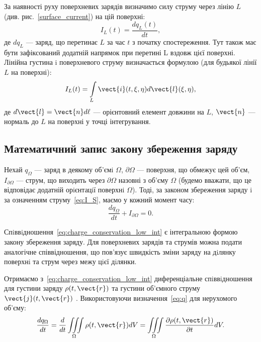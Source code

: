 \begin{itemize}
	      За наявності руху поверхневих зарядів визначимо силу струму через лінію
	      $L$ (див. рис.~\ref{surface_current}) на цій поверхні:
	      \begin{equation}
		      I_L(t) = \frac{dq_L(t)}{dt},
	      \end{equation}
	      де $dq_L$ --- заряд, що перетинає $L$ за час $ t$ з початку спостереження. Тут також
	      має бути зафіксований додатній напрямок при перетині L вздовж цієї поверхні.
	      Лінійна густина i поверхневого струму визначається формулою (для будьякої лінії $L$ на поверхні):
	      \begin{equation}
		      I_L(t) = \int\limits_L \vect{i}(t, \xi, \eta) d\vect{l}(\xi, \eta),
	      \end{equation}
	      де $d\vect{l} = \vect{n} d \ell$ --- орієнтовний елемент довжини на $L$, $\vect{n}$ --- нормаль до $L$ на поверхні у
	      точці інтегрування.

\end{itemize}

\subsection*{Математичний запис закону збереження заряду}


Нехай $q_{\Omega}$ --- заряд в деякому об'ємi $\Omega$, $\partial\Omega$ --- поверхня, що обмежує цей
об'єм, $I_{\partial\Omega}$ --- струм, що виходить через $\partial\Omega$ назовні з об'єму $\Omega$ (будемо вважати,
що це відповідає додатній орiєнтацiї поверхнi $\Omega$). Тоді, за законом збереження заряду i за означенням струму~\eqref{eq:I_S}, маємо у кожний момент
часу:
\begin{equation}\label{eq:charge_conservation_low_int}
	\frac{dq_{\Omega}}{dt} + I_{\partial\Omega}   = 0.
\end{equation}

Спiввiдношення~\eqref{eq:charge_conservation_low_int} є інтегральною формою закону збереження
заряду. Для поверхневих зарядів та струмів можна подати аналогічне
співвідношення, що пов’язує швидкість зміни заряду на дiлянку поверхнi та
струм через межу цiєї дiлянки.

Отримаємо з~\eqref{eq:charge_conservation_low_int} диференціальне спiввiдношення для густини заряду
$\rho(t, \vect{r})$ та густини об'ємного струму $\vect{j}(t, \vect{r})$ . Використовуючи визначення~\eqref{eq:q}
для нерухомого об'єму:
\begin{equation*}
	\frac{dq_{\Omega}}{dt} = \frac{d}{dt} \iiint\limits_{\Omega} \rho(t, \vect{r}) dV = \iiint\limits_{\Omega} \frac{\partial\rho(t, \vect{r})}{\partial
		t} dV.
\end{equation*}

